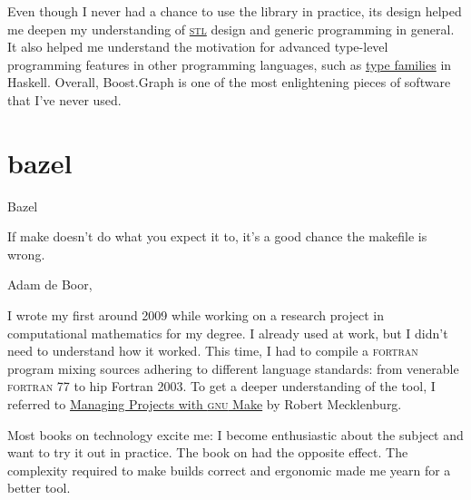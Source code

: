 \documentclass{article}
\begin{document}
Even though I never had a chance to use the library in practice, its design helped me deepen my understanding of \href{https://en.wikipedia.org/wiki/Standard_Template_Library}{\textsc{stl}} design and generic programming in general.
It also helped me understand the motivation for advanced type-level programming features in other programming languages, such as \href{https://wiki.haskell.org/GHC/Type_families}{type families} in Haskell.
Overall, Boost.Graph is one of the most enlightening pieces of software that I've never used.

\section{bazel}{Bazel}

\epigraph{
  If make doesn't do what you expect it to, it's a good chance the makefile is wrong.
}{
  Adam de Boor, \href{https://docs-archive.freebsd.org/44doc/psd/12.make/paper.pdf}{\cite{PMake---A Tutorial}}
}

I wrote my first  around 2009 while working on a research project in computational mathematics for my degree.
I already used \href{https://en.wikipedia.org/wiki/Make_(software)}{} at work, but I didn't need to understand how it worked.
This time, I had to compile a \textsc{fortran} program mixing sources adhering to different language standards: from venerable \textsc{fortran} 77 to hip Fortran 2003.
To get a deeper understanding of the tool, I referred to \href{https://www.oreilly.com/library/view/managing-projects-with/0596006101/}{Managing Projects with \textsc{gnu} Make} by Robert Mecklenburg.

Most books on technology excite me: I become enthusiastic about the subject and want to try it out in practice. 
The book on  had the opposite effect.
The complexity required to make builds correct and ergonomic made me yearn for a better tool.
\end{document}
